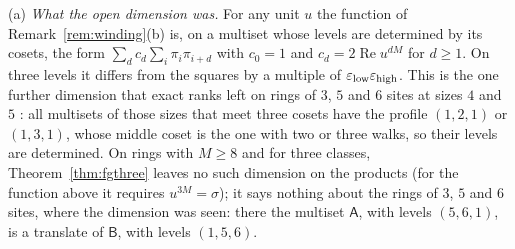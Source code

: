 \begin{remark}\label{rem:tpprod}
(a) \emph{What the open dimension was.} For any unit $u$ the function of Remark~\ref{rem:winding}(b) is, on a multiset whose levels are determined by its cosets, the form $\sum_dc_d\sum_i\pi_i\pi_{i+d}$ with $c_0=1$ and $c_d=2\operatorname{Re}u^{dM}$ for $d\ge1$. On three levels it differs from the squares by a multiple of $\varepsilon_{\rm low}\varepsilon_{\rm high}$. This is the one further dimension that exact ranks left on rings of $3$, $5$ and $6$ sites at sizes $4$ and $5$ \cite{comp4s}: all multisets of those sizes that meet three cosets have the profile $(1,2,1)$ or $(1,3,1)$, whose middle coset is the one with two or three walks, so their levels are determined. On rings with $M\ge8$ and for three classes, Theorem~\ref{thm:fgthree} leaves no such dimension on the products (for the function above it requires $u^{3M}=\sigma$); it says nothing about the rings of $3$, $5$ and $6$ sites, where the dimension was seen: there the multiset $\mathsf{A}$, with levels $(5,6,1)$, is a translate of $\mathsf{B}$, with levels $(1,5,6)$.

\end{remark}
